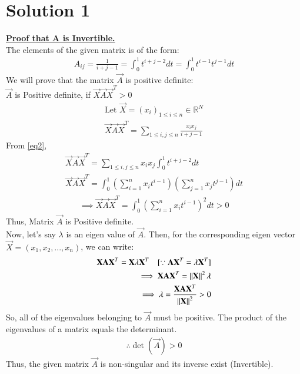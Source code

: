 \documentclass[journal,12pt,twocolumn]{IEEEtran}
\begin{document}
\section{Solution 1}
\underline{\textbf{Proof that A is Invertible.}}\\
The elements of the given matrix is of the form:
\begin{align}
    A_{ij} = \frac{1}{i+j-1}= \int_{0}^{1}t^{i+j-2}dt= \int_{0}^{1}t^{i-1}t^{j-1}dt \label{eq2}
\end{align}
We will prove that the matrix $\vec{A}$ is positive definite:\\
$\vec{A}$ is Positive definite, if $\vec{X}\Vec{A}\vec{X}^T>0$
\begin{align}
   \text{Let } \vec{X}=(x_i)_{1\leq i\leq n} \in \mathbb{R}^N\\
   \vec{X}\Vec{A}\vec{X}^T=\sum_{1\leq i,j\leq n}\frac{x_ix_j}{i+j-1}
\end{align}
From \eqref{eq2},
\begin{align}
   \vec{X}\Vec{A}\vec{X}^T=\sum_{1\leq i,j\leq n}x_ix_j\int_0^1t^{i+j-2}dt\\
   \vec{X}\Vec{A}\vec{X}^T=\int_0^1\left(\sum_{i=1}^nx_it^{i-1}\right)\left(\sum_{j=1}^nx_jt^{j-1}\right)dt
\end{align}
\begin{align}
       \implies \vec{X}\Vec{A}\vec{X}^T=\int_0^1\left(\sum_{i=1}^nx_it^{i-1}\right)^2dt>0
\end{align}
Thus, Matrix $\vec{A}$ is Positive definite. \\
Now, let's say $\lambda$ is an eigen value of $\vec{A}$. Then, for the corresponding eigen vector $\vec{X}=(x_1,x_2,...,x_n)$, we can write:
\begin{align}
       \vec{X}\Vec{A}\vec{X}^T=\vec{X}\lambda\vec{X}^T \quad [\because  \Vec{A}\vec{X}^T=\lambda\vec{X}^T]\\
       \implies \vec{X}\Vec{A}\vec{X}^T=\norm{\vec{X}}^2\lambda\\
       \implies \lambda=\frac{\vec{X}\Vec{A}\vec{X}^T}{\norm{\vec{X}}^2}>0
\end{align}
So, all of the eigenvalues belonging to  $\vec{A}$ must be positive. The product of the eigenvalues of a matrix equals the determinant.
\begin{align}
    \boxed{\therefore \det({\vec{A}})>0}
\end{align}
Thus, the given matrix $\vec{A}$ is non-singular and its inverse exist (Invertible).\\ \\
\end{document}
